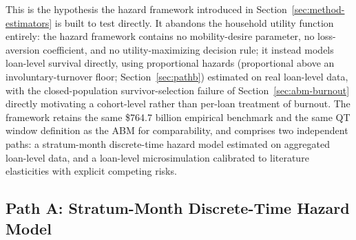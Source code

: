 \documentclass[12pt]{article}
\begin{document}
This is the hypothesis the hazard framework introduced in Section~\ref{sec:method-estimators} is built to test directly. It abandons the household utility function entirely: the hazard framework contains no mobility-desire parameter, no loss-aversion coefficient, and no utility-maximizing decision rule; it instead models loan-level survival directly, using proportional hazards (proportional above an involuntary-turnover floor; Section~\ref{sec:pathb}) estimated on real loan-level data, with the closed-population survivor-selection failure of Section~\ref{sec:abm-burnout} directly motivating a cohort-level rather than per-loan treatment of burnout. The framework retains the same \$764.7 billion empirical benchmark and the same QT window definition as the ABM for comparability, and comprises two independent paths: a stratum-month discrete-time hazard model estimated on aggregated loan-level data, and a loan-level microsimulation calibrated to literature elasticities with explicit competing risks.

\subsection{Path A: Stratum-Month Discrete-Time Hazard Model}\label{sec:patha}
\end{document}
